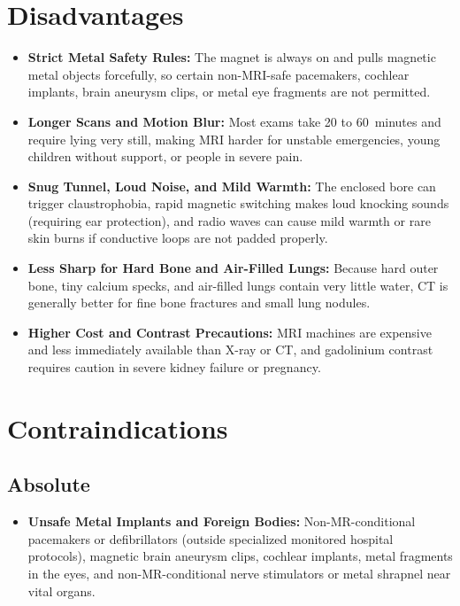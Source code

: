 \section{Disadvantages}
\begin{itemize}
\item \textbf{Strict Metal Safety Rules:} The magnet is always on and pulls magnetic metal objects forcefully, so certain non-MRI-safe pacemakers, cochlear implants, brain aneurysm clips, or metal eye fragments are not permitted.
\item \textbf{Longer Scans and Motion Blur:} Most exams take 20 to 60~minutes and require lying very still, making MRI harder for unstable emergencies, young children without support, or people in severe pain.
\item \textbf{Snug Tunnel, Loud Noise, and Mild Warmth:} The enclosed bore can trigger claustrophobia, rapid magnetic switching makes loud knocking sounds (requiring ear protection), and radio waves can cause mild warmth or rare skin burns if conductive loops are not padded properly.
\item \textbf{Less Sharp for Hard Bone and Air-Filled Lungs:} Because hard outer bone, tiny calcium specks, and air-filled lungs contain very little water, CT is generally better for fine bone fractures and small lung nodules.
\item \textbf{Higher Cost and Contrast Precautions:} MRI machines are expensive and less immediately available than X-ray or CT, and gadolinium contrast requires caution in severe kidney failure or pregnancy.
\end{itemize}

\section{Contraindications}

\subsection{Absolute}
\begin{itemize}
\item \textbf{Unsafe Metal Implants and Foreign Bodies:} Non-MR-conditional pacemakers or defibrillators (outside specialized monitored hospital protocols), magnetic brain aneurysm clips, cochlear implants, metal fragments in the eyes, and non-MR-conditional nerve stimulators or metal shrapnel near vital organs.
\end{itemize}

